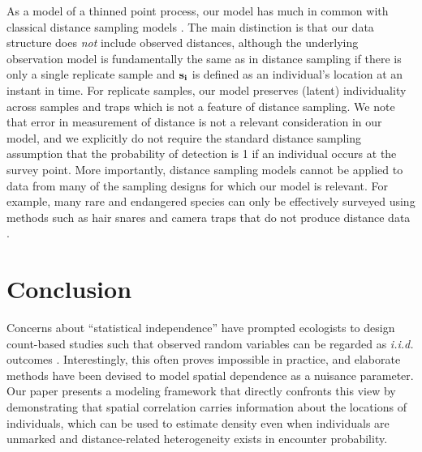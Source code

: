 As a model of a thinned point process, our model has much in common
with classical distance sampling models \citep{buckland_etal:2001}.
The main distinction is that our data structure does {\it not} include
observed distances, although the underlying observation model is
fundamentally the same as in distance sampling if there is only a
single replicate sample and $\bf{s}_i$ is defined as an individual's
location at an instant in time. For replicate samples, our model preserves
(latent) individuality across samples and traps which is not a feature
of distance sampling. We note that error in measurement of distance is
not a relevant consideration in our model, and we explicitly do not
require the standard distance sampling assumption that the probability
of detection is 1 if an individual occurs at the survey point. More
importantly, distance sampling models cannot be applied to data from
many of the sampling designs for which our model is relevant. For
example, many rare and endangered species can only be
effectively surveyed using methods such as hair snares and camera
traps that do not produce distance data \citep{oconnell_etal:2010}.


\section{Conclusion}

Concerns about ``statistical independence'' have prompted
ecologists to design count-based studies such that observed
random variables can be regarded as {\it i.i.d.} outcomes
\citep{hurlbert:1984}. Interestingly, this
often proves impossible in practice, and elaborate
methods have been devised to model spatial dependence as a nuisance
parameter. Our paper presents a modeling framework that directly
confronts this view by demonstrating that spatial
correlation carries information about the locations of individuals,
which can be used to estimate density even when individuals
are unmarked and distance-related heterogeneity exists in encounter
probability.






